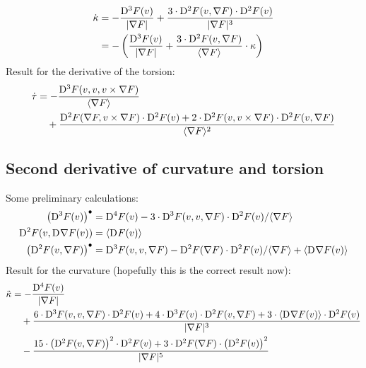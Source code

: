 \begin{align}
    \dot{ \kappa }   &=
    - \frac{ \mathrm{D}^{ 3 }F( v ) }{ \lvert  \nabla F  \rvert }  +
    \frac{ 3 \cdot \mathrm{D}^{ 2 }F( v, \nabla F ) \cdot \mathrm{D}^{ 2 }F( v ) }{
    \lvert  \nabla F  \rvert^3 }   \\
    &=
    - \left( \frac{ \mathrm{D}^{ 3 }F( v ) }{ \lvert  \nabla F  \rvert }  +
    \frac{ 3 \cdot \mathrm{D}^{ 2 }F( v, \nabla F ) }{
    \langle \nabla F \rangle } \cdot \kappa \right)
\end{align}
Result for the derivative of the torsion:
\begin{align}
    \dot{ \tau }   &=
    - \frac{ \mathrm{D}^{ 3 }F( v, v, v \times \nabla F ) }{ \langle  \nabla F  \rangle }  \nonumber\\
    &\quad+  \frac{ \mathrm{D}^{ 2 }F( \nabla F, v \times \nabla F ) \cdot \mathrm{D}^{ 2 }F( v )  +
    2 \cdot \mathrm{D}^{ 2 }F( v, v \times \nabla F ) \cdot \mathrm{D}^{ 2 }F( v, \nabla F ) }{
    \langle  \nabla F  \rangle^2 }
\end{align}




\subsection{Second derivative of curvature and torsion}



Some preliminary calculations:
\begin{align}
    \left( \mathrm{D}^{ 3 }F( v ) \right)^\bullet   &=
    \mathrm{D}^{ 4 }F( v )  -
    3 \cdot \mathrm{D}^{ 3 }F( v, v, \nabla F ) \cdot \mathrm{D}^{ 2 }F( v ) / \langle \nabla F \rangle   \\
    \mathrm{D}^{ 2 }F( v, \mathrm{D}^{  }\nabla F( v ) )   &=
    \langle \mathrm{D}^{  }F( v ) \rangle   \\
    \left( \mathrm{D}^{ 2 }F( v, \nabla F ) \right)^\bullet   &=
    \mathrm{D}^{ 3 }F( v, v, \nabla F )  -
    \mathrm{D}^{ 2 }F( \nabla F ) \cdot \mathrm{D}^{ 2 }F( v ) / \langle \nabla F \rangle  +
    \langle \mathrm{D}^{  }\nabla F( v ) \rangle
\end{align}
Result for the curvature (hopefully this is the correct result now):
\begin{align}
    \ddot{\kappa}   &=
    - \frac{ \mathrm{D}^{ 4 }F( v ) }{ \lvert  \nabla F  \rvert }   \\
    &\quad+
    \frac{ 6 \cdot \mathrm{D}^{ 3 }F( v, v, \nabla F ) \cdot \mathrm{D}^{ 2 }F( v )  +
    4 \cdot \mathrm{D}^{ 3 }F( v ) \cdot \mathrm{D}^{ 2 }F( v, \nabla F )  +
    3 \cdot \langle \mathrm{D}^{  }\nabla F( v ) \rangle \cdot \mathrm{D}^{ 2 }F( v ) }{ \lvert  \nabla F  \rvert^3 }   \\
    &\quad-
    \frac{ 15 \cdot \left( \mathrm{D}^{ 2 }F( v, \nabla F ) \right)^2 \cdot \mathrm{D}^{ 2 }F( v )  +
    3 \cdot \mathrm{D}^{ 2 }F( \nabla F ) \cdot \left( \mathrm{D}^{ 2 }F( v ) \right)^2
    }{ \lvert  \nabla F  \rvert^5 }
\end{align}
